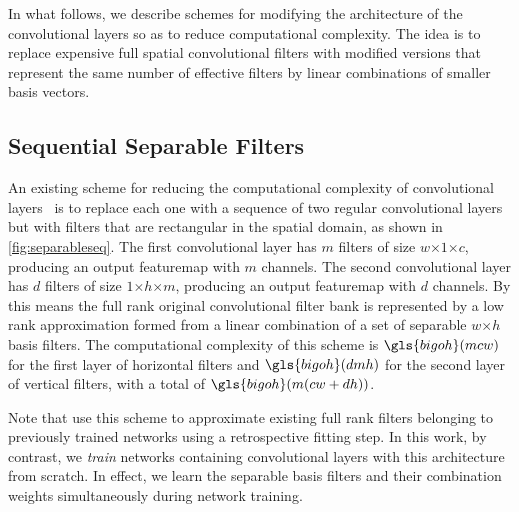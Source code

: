 \documentclass[thesis]{subfiles}
\begin{document}
    In what follows, we describe schemes for modifying the architecture of the convolutional layers so as to reduce computational complexity. The idea is to replace expensive full spatial convolutional filters with modified versions that represent the same number of effective filters by linear combinations of smaller basis vectors. 
    
    \subsection{Sequential Separable Filters}\label{seqsep}
    An existing scheme for reducing the computational complexity of convolutional layers~\citep{journals/corr/JaderbergVZ14} is to replace each one with a sequence of two regular convolutional layers but with filters that are rectangular in the spatial domain, as shown in \cref{fig:separableseq}. The first convolutional layer has $m$ filters of size $w$$\times$$1$$\times$$c$, producing an output \gls{featuremap} with $m$ channels. The second convolutional layer has $d$ filters of size $1$$\times$$h$$\times$$m$, producing an output \gls{featuremap} with $d$ channels. By this means the full rank original convolutional filter bank is represented by a low rank approximation formed from a linear combination of a set of separable $w$$\times$$h$ basis filters.  The computational complexity of this scheme is $\gls{bigoh}(m c w)$ for the first layer of horizontal filters and $\gls{bigoh}(d m h)$ for the second layer of vertical filters, with a total of $\gls{bigoh}(m(c w + d h))$.
    
    Note that \citet{journals/corr/JaderbergVZ14} use this scheme to approximate existing full rank filters belonging to previously trained networks using a retrospective fitting step. In this work, by contrast,  we {\em train} networks containing convolutional layers with this architecture from scratch. In effect, we learn the separable basis filters and their combination weights simultaneously during network training.
    
    
\end{document}
